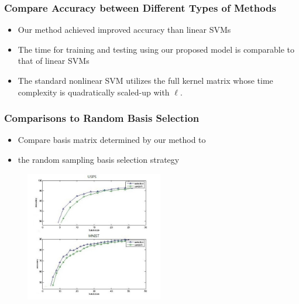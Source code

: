\documentclass{beamer}
\begin{document}
\begin{frame}
\frametitle{Compare Accuracy between Different Types of Methods}
\begin{itemize}
  \item Our method achieved improved accuracy than linear SVMs
  \item The time for training and testing using our proposed model is comparable to that of linear SVMs
  \item The standard nonlinear SVM utilizes the full kernel matrix whose time complexity is quadratically scaled-up with $\ell$.
\end{itemize}

\begin{table}
{\small
{}
\label{tab:mrkl_with_others}
}\end{table}
\end{frame}

\begin{frame}
\frametitle{Comparisons to Random Basis Selection}
\begin{itemize}
  \item Compare basis matrix determined by our method to
  \item the random sampling basis selection strategy
\end{itemize}
\begin{figure}[h!]
\centering
  \includegraphics[width=6cm]{compare.jpg}
\label{fig:select}
\end{figure}

\end{frame}
\end{document}
